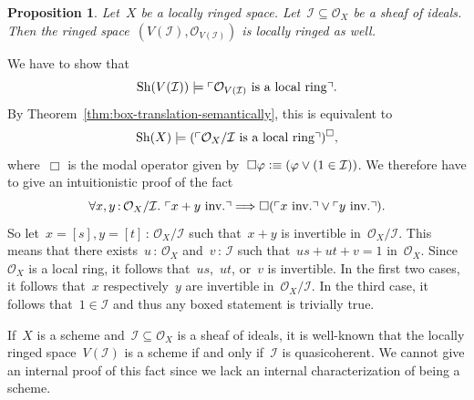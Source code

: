 \documentclass[10pt,reqno,a4paper]{amsbook}
\makeatletter
\theoremstyle{definition}
\theoremstyle{plain}
\newtheorem{prop}[defn]{Proposition}
\theoremstyle{remark}
\renewcommand{\O}{\mathcal{O}}
\newcommand{\I}{\mathcal{I}}
\newcommand{\Sh}{\mathrm{Sh}}
\newcommand{\?}{\,{:}\,}
\renewcommand{\_}{\mathpunct{.}\,}
\newcommand{\speak}[1]{\ulcorner\text{\textnormal{#1}}\urcorner}
\newcommand{\inv}{inv.\@}
\newcommand{\defequiv}{\vcentcolon\equiv}
\renewenvironment{proof}[1][\proofname]{\par
  \pushQED{\qed}%
  \normalfont \topsep6\p@\@plus6\p@\relax
  \trivlist
  \item[\hskip\labelsep
        \itshape
    #1\@addpunct{.}]\ignorespaces
}{%
  \popQED\endtrivlist\@endpefalse
}
\makeatother
\begin{document}
\begin{prop}Let~$X$ be a locally ringed space. Let~$\I \subseteq \O_X$ be a
sheaf of ideals. Then the ringed space~$(V(\I), \O_{V(\I)})$ is locally
ringed as well.\end{prop}
\begin{proof}We have to show that
\[ \Sh(V(\I)) \models \speak{$\O_{V(\I)}$ is a local ring}. \]
By Theorem~\ref{thm:box-translation-semantically}, this is equivalent to
\[ \Sh(X) \models (\speak{$\O_X/\I$ is a local ring})^\Box, \]
where~$\Box$ is the modal operator given by~$\Box\varphi \defequiv (\varphi \vee
(1 \in \I))$. We therefore have to give an intuitionistic proof of the fact
\[ \forall x,y\?\O_X/\I\_ \speak{$x+y$ \inv} \Longrightarrow
  \Box(\speak{$x$ \inv} \vee \speak{$y$ \inv}). \]
So let~$x = [s], y = [t] \? \O_X/\I$ such that~$x + y$ is invertible
in~$\O_X/\I$. This means that there exists~$u\?\O_X$ and~$v\?\I$ such that~$us
+ ut + v = 1$ in~$\O_X$. Since~$\O_X$ is a local ring, it follows
that~$us$,~$ut$, or~$v$ is invertible. In the first two cases, it follows
that~$x$ respectively~$y$ are invertible in~$\O_X/\I$. In the third case, it
follows that~$1 \in \I$ and thus any boxed statement is trivially true.
\end{proof}

If~$X$ is a scheme and~$\I \subseteq \O_X$ is a sheaf of ideals, it is well-known
that the locally ringed space~$V(\I)$ is a scheme if and only if~$\I$ is
quasicoherent. We cannot give an internal proof of this fact since we lack an
internal characterization of being a scheme.
\end{document}
